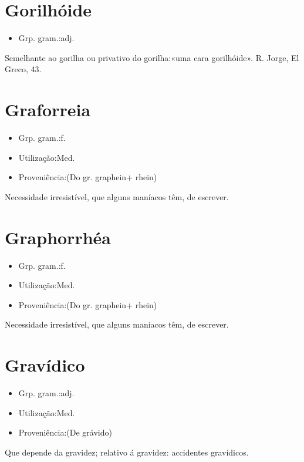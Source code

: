 \section{Gorilhóide}
\begin{itemize}
\item {Grp. gram.:adj.}
\end{itemize}
Semelhante ao gorilha ou privativo do gorilha:«\textunderscore uma cara gorilhóide\textunderscore ». R. Jorge, \textunderscore El Greco\textunderscore , 43.
\section{Graforreia}
\begin{itemize}
\item {Grp. gram.:f.}
\end{itemize}
\begin{itemize}
\item {Utilização:Med.}
\end{itemize}
\begin{itemize}
\item {Proveniência:(Do gr. \textunderscore graphein\textunderscore  + \textunderscore rhein\textunderscore )}
\end{itemize}
Necessidade irresistível, que alguns maníacos têm, de escrever.
\section{Graphorrhéa}
\begin{itemize}
\item {Grp. gram.:f.}
\end{itemize}
\begin{itemize}
\item {Utilização:Med.}
\end{itemize}
\begin{itemize}
\item {Proveniência:(Do gr. \textunderscore graphein\textunderscore  + \textunderscore rhein\textunderscore )}
\end{itemize}
Necessidade irresistível, que alguns maníacos têm, de escrever.
\section{Gravídico}
\begin{itemize}
\item {Grp. gram.:adj.}
\end{itemize}
\begin{itemize}
\item {Utilização:Med.}
\end{itemize}
\begin{itemize}
\item {Proveniência:(De \textunderscore grávido\textunderscore )}
\end{itemize}
Que depende da gravidez; relativo á gravidez: \textunderscore accidentes gravídicos\textunderscore .
